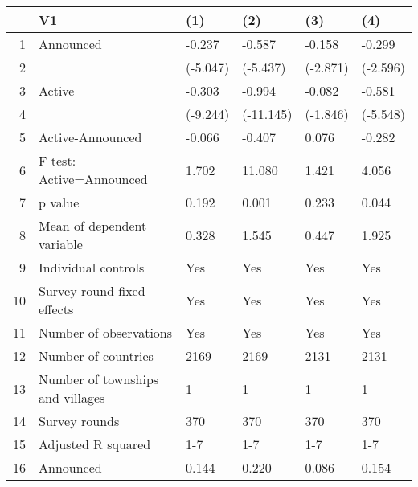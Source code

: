 \begin{table}[ht]
\centering
\begin{tabular}{rlllll}
  \hline
 & V1 & (1) & (2) & (3) & (4) \\ 
  \hline
1 & Announced & -0.237 & -0.587 & -0.158 & -0.299 \\ 
  2 &  & (-5.047) & (-5.437) & (-2.871) & (-2.596) \\ 
  3 & Active & -0.303 & -0.994 & -0.082 & -0.581 \\ 
  4 &  & (-9.244) & (-11.145) & (-1.846) & (-5.548) \\ 
  5 & Active-Announced & -0.066 & -0.407 & 0.076 & -0.282 \\ 
  6 & F test: Active=Announced & 1.702 & 11.080 & 1.421 & 4.056 \\ 
  7 & p value & 0.192 & 0.001 & 0.233 & 0.044 \\ 
  8 & Mean of dependent variable & 0.328 & 1.545 & 0.447 & 1.925 \\ 
  9 & Individual controls & Yes & Yes & Yes & Yes \\ 
  10 & Survey round fixed effects & Yes & Yes & Yes & Yes \\ 
  11 & Number of observations & Yes & Yes & Yes & Yes \\ 
  12 & Number of countries & 2169 & 2169 & 2131 & 2131 \\ 
  13 & Number of townships and villages & 1 & 1 & 1 & 1 \\ 
  14 & Survey rounds & 370 & 370 & 370 & 370 \\ 
  15 & Adjusted R squared & 1-7 & 1-7 & 1-7 & 1-7 \\ 
  16 & Announced & 0.144 & 0.220 & 0.086 & 0.154 \\ 
   \hline
\end{tabular}
\end{table}
